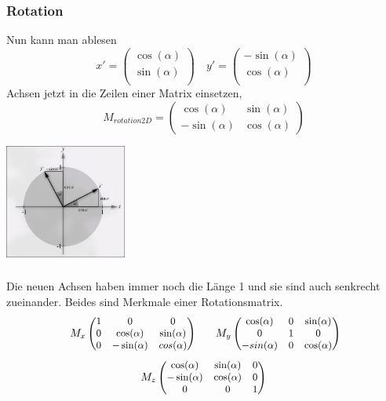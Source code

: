 \documentclass{beamer}
\begin{document}
\begin{frame}
	\frametitle{Rotation}
	\begin{minipage}{0.6\textwidth}
	\small
	Nun kann man ablesen 
	\[
	x' =
	\begin{pmatrix}
		\cos(\alpha) \\
		\sin(\alpha) \\
	\end{pmatrix}
	\quad 
	y' =
	\begin{pmatrix}
		-\sin(\alpha) \\
		\cos(\alpha) \\
	\end{pmatrix}
	\]
	Achsen jetzt in die Zeilen einer Matrix einsetzen,
	\[
	M_{rotation2D} =
	\begin{pmatrix}
		\cos(\alpha) & \sin(\alpha) \\
		-\sin(\alpha) & \cos(\alpha)
	\end{pmatrix}
	\]
	\end{minipage}
	\hfill
	\begin{minipage}{0.3\textwidth}
		\hspace{-10mm}
		\centering
		\includegraphics[width=4cm]{bilder/circle.png}
	\end{minipage}
		
	\end{frame}
	
\begin{frame}
	\frametitle{\phantom{}}
	\textmd{\small Die neuen Achsen haben immer noch die Länge 1 und
	sie sind auch senkrecht zueinander. Beides sind Merkmale einer Rotationsmatrix.} \\
	\[
\quad
\small
M_{x}
\begin{pmatrix}
	1 & 0 & 0 \\
	0 & \cos(\alpha) & \sin(\alpha) \\
	0 & -\sin(\alpha) & cos(\alpha)
\end{pmatrix}
\quad \!
\quad
M_{y}
\begin{pmatrix}
	\cos(\alpha) & 0 & \sin(\alpha) \\
	0 & 1 & 0 \\
	-sin(\alpha) & 0 & \cos(\alpha) 
\end{pmatrix}
\quad \!
\]
\[
\small
M_{z}
\begin{pmatrix}
	\cos(\alpha) & \sin(\alpha) & 0 \\
	-\sin(\alpha) & \cos(\alpha) & 0 \\
	0 & 0 & 1
\end{pmatrix}
\]
\end{frame}
\end{document}
